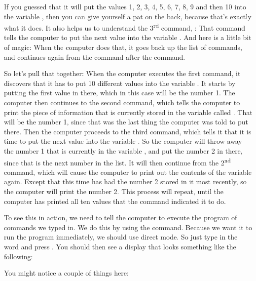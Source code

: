 If you guessed
that it will put the values 1, 2, 3, 4, 5, 6, 7, 8, 9 and then 10 into the variable , then you
can give yourself a pat on the back, because that's exactly what it does.  It also helps us to
understand the 3\textsuperscript{rd} command, : That command tells the computer to put the next value into
the variable .  And here is a little bit of magic: When the computer does that, it goes back
up the list of commands, and continues again from the command after the  command.

So let's pull that together: When the computer executes the first command, it discovers that it has
to put 10 different values into the variable . It starts by putting the first value in there, which
in this case will be the number 1.
The computer then continues to the second command, which tells the computer to print the piece of
information that is currently stored in the variable called . That will be the number 1, since
that was the last thing the computer was told to put there.  Then the computer proceeds to the
third command, which tells it that it is time to put the next value into the variable .  So the
computer will throw away the number 1 that is currently in the variable , and put the number 2 in
there, since that is the next number in the list.  It will then continue from the 2\textsuperscript{nd} command,
which will cause the computer to print out the contents of the variable  again.  Except that this
time  has had the number 2 stored in it most recently, so the computer will print the number 2.
This process will repeat, until the computer has printed all ten values that the  command
indicated it to do.

\needspace{4cm} %
To see this in action, we need to tell the computer to execute the program of commands we typed in.
We do this by using the  command. Because we want it to run the program immediately, we
should use direct mode.
So just type in the word  and press .  You should then see a display
that looks something like the following:


  You might notice a couple of things here:

